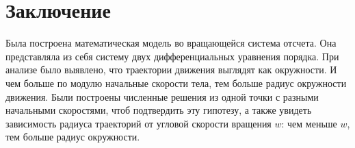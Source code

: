 \pagebreak
	
	\section{Заключение}
		Была построена математическая модель во вращающейся система отсчета. Она представляла из себя систему двух дифференциальных уравнения  порядка. При анализе было выявлено, что траектории движения выглядят как окружности. И чем больше по модулю начальные скорости тела, тем больше радиус окружности движения. Были построены численные решения из одной точки с разными начальными скоростями, чтоб подтвердить эту гипотезу, а также увидеть зависимость радиуса траекторий от угловой скорости вращения \( w \): чем меньше \( w \), тем больше радиус окружности.

\pagebreak